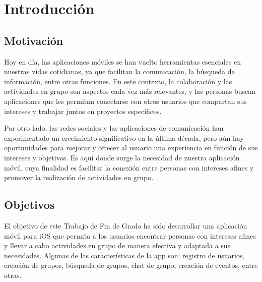 \chapter{Introducción}
\section{Motivación}
Hoy en día, las aplicaciones móviles se han vuelto herramientas 
esenciales en nuestras vidas cotidianas, ya que facilitan la 
comunicación, la búsqueda de información, entre otras funciones. 
En este contexto, la colaboración y las actividades en grupo son 
aspectos cada vez más relevantes, y las personas buscan aplicaciones 
que les permitan conectarse con otros usuarios que compartan sus 
intereses y trabajar juntos en proyectos específicos.

Por otro lado, las redes sociales y las aplicaciones de comunicación 
han experimentado un crecimiento significativo en la última década, 
pero aún hay oportunidades para mejorar y ofrecer al usuario una experiencia en función de sus intereses y objetivos. Es aquí donde 
surge la necesidad de nuestra aplicación móvil, cuya finalidad es 
facilitar la conexión entre personas con intereses afines y promover 
la realización de actividades en grupo.

\section{Objetivos}
El objetivo de este Trabajo de Fin de Grado ha sido desarrollar una 
aplicación móvil para iOS que permita a los usuarios 
encontrar personas con intereses afines y llevar a cabo actividades 
en grupo de manera efectiva y adaptada a sus necesidades. Algunas 
de las características de la app son: registro de usuarios, creación 
de grupos, búsqueda de grupos, chat de grupo, creación de eventos, entre otras.

\begin{comment}
Para satisfacer las necesidades de los usuarios, se ha diseñado una 
interfaz amigable y funcional que facilite la interacción y el uso de 
la aplicación.
\end{comment}
